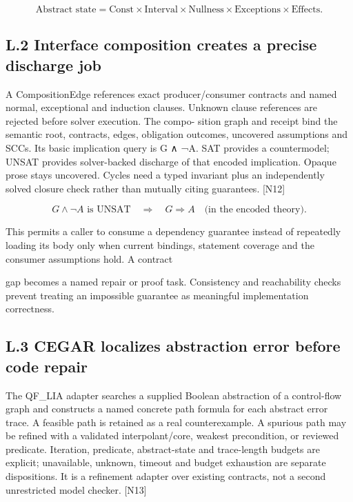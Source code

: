 \setcounter{equation}{3}
\begin{equation}
\text{Abstract state}=\mathrm{Const}\times\mathrm{Interval}\times\mathrm{Nullness}\times\mathrm{Exceptions}\times\mathrm{Effects}.
\tag{4}\end{equation}

\subsection*{L.2 Interface composition creates a precise discharge job}

A CompositionEdge references exact producer/consumer contracts and named normal, exceptional
and induction clauses. Unknown clause references are rejected before solver execution. The compo-
sition graph and receipt bind the semantic root, contracts, edges, obligation outcomes, uncovered
assumptions and SCCs. Its basic implication query is G ∧ ¬A. SAT provides a countermodel;
UNSAT provides solver-backed discharge of that encoded implication. Opaque prose stays uncovered.
Cycles need a typed invariant plus an independently solved closure check rather than mutually citing
guarantees. [N12]

\setcounter{equation}{4}
\begin{equation}
G\land\neg A\text{ is UNSAT}\quad\Rightarrow\quad G\Rightarrow A\quad\text{(in the encoded theory).}
\tag{5}\end{equation}

This permits a caller to consume a dependency guarantee instead of repeatedly loading its body
only when current bindings, statement coverage and the consumer assumptions hold. A contract


gap becomes a named repair or proof task. Consistency and reachability checks prevent treating an
impossible guarantee as meaningful implementation correctness.

\subsection*{L.3 CEGAR localizes abstraction error before code repair}

The QF\_LIA adapter searches a supplied Boolean abstraction of a control-flow graph and constructs
a named concrete path formula for each abstract error trace. A feasible path is retained as a
real counterexample. A spurious path may be refined with a validated interpolant/core, weakest
precondition, or reviewed predicate. Iteration, predicate, abstract-state and trace-length budgets
are explicit; unavailable, unknown, timeout and budget exhaustion are separate dispositions. It is a
refinement adapter over existing contracts, not a second unrestricted model checker. [N13]


